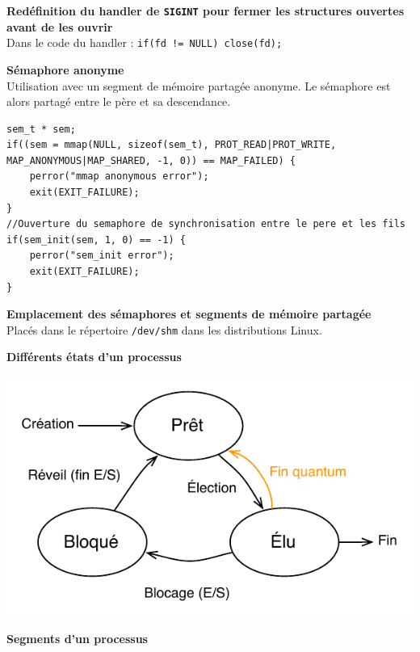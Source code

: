 \documentclass[french]{scrartcl}
\makeatletter
\newenvironment{BlockIndent}{\list{}%
    {\setlength{\leftmargin}{4mm}%
	 \setlength{\listparindent}{\parindent}%
     \setlength{\itemindent}{\listparindent}%
     \setlength{\topsep}{0pt}}%
     \item[]\relax}
{\endlist}
\newenvironment{figurehere}
  {\def\@captype{figure}}
  {}
\makeatother
\begin{document}
\begin{multicols}{3}
\vskip 5pt
\textbf{Redéfinition du handler de \lstinline!SIGINT! pour fermer les structures ouvertes avant de les ouvrir}\\
Dans le code du handler : \lstinline&if(fd != NULL) close(fd);&

\vskip 5pt
\textbf{Sémaphore anonyme}\\
Utilisation avec un segment de mémoire partagée anonyme. Le sémaphore est alors partagé entre le père et sa descendance.
\begin{BlockIndent}
\vspace{-5pt}\begin{lstlisting}
sem_t * sem;
if((sem = mmap(NULL, sizeof(sem_t), PROT_READ|PROT_WRITE, MAP_ANONYMOUS|MAP_SHARED, -1, 0)) == MAP_FAILED) {
	perror("mmap anonymous error");
	exit(EXIT_FAILURE);
}
//Ouverture du semaphore de synchronisation entre le pere et les fils
if(sem_init(sem, 1, 0) == -1) {
	perror("sem_init error");
	exit(EXIT_FAILURE);
}
\end{lstlisting}\vspace{-5pt}
\end{BlockIndent}

\vskip 5pt
\textbf{Emplacement des sémaphores et segments de mémoire partagée}\\
Placés dans le répertoire \lstinline!/dev/shm! dans les distributions Linux.

\vskip 5pt
\textbf{Différents états d'un processus}

\begin{figurehere}
    \includegraphics[scale=.6]{images/etat-process-split-time}
\end{figurehere}

\columnbreak
\textbf{Segments d'un processus}


\end{multicols}
\end{document}
